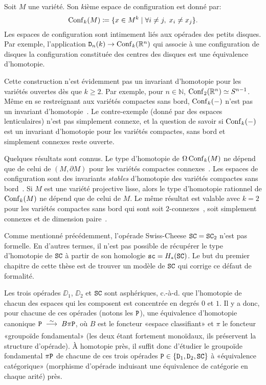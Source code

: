 Soit $M$ une variété. Son $k$ième espace de configuration est donné par:
\[ \operatorname{Conf}_{k}(M) \coloneqq \{ x \in M^{k} \mid \forall i \neq j, \; x_{i} \neq x_{j} \}. \]
Les espaces de configuration sont intimement liés aux opérades des petits disques.
Par exemple, l'application $\mathtt{D}_{n}(k) \to \operatorname{Conf}_{k}(\mathbb{R}^{n})$ qui associe à une configuration de disques la configuration constituée des centres des disques est une équivalence d'homotopie.

Cette construction n'est évidemment pas un invariant d'homotopie pour les variétés ouvertes dès que $k \geq 2$.
Par exemple, pour $n \in \mathbb{N}$, $\operatorname{Conf}_{2}(\mathbb{R}^{n}) \simeq S^{n-1}$.
Même en se restreignant aux variétés compactes sans bord, $\operatorname{Conf}_{k}(-)$ n'est pas un invariant d'homotopie~\cite{LongoniSalvatore2005}.
Le contre-exemple (donné par des espaces lenticulaires) n'est pas simplement connexe, et la question de savoir si $\operatorname{Conf}_{k}(-)$ est un invariant d'homotopie pour les variétés compactes, sans bord et simplement connexes reste ouverte.

Quelques résultats sont connus.
Le type d'homotopie de $\Omega \operatorname{Conf}_{k}(M)$ ne dépend que de celui de $(M, \partial M)$ pour les variétés compactes connexes~\cite{Levitt1995}.
Les espaces de configuration sont des invariants \emph{stables} d'homotopie des variétés compactes sans bord~\cite{AouinaKlein2004}.
Si $M$ est une variété projective lisse, alors le type d'homotopie rationnel de $\operatorname{Conf}_{k}(M)$ ne dépend que de celui de $M$.
Le même résultat est valable avec $k = 2$ pour les variétés compactes sans bord qui sont soit $2$-connexes~\cite{LambrechtsStanley2004}, soit simplement connexes et de dimension paire~\cite{CordovaBulens2015}.


Comme mentionné précédemment, l'opérade Swiss-Cheese $\mathtt{SC} = \mathtt{SC}_{2}$ n'est pas formelle.
En d'autres termes, il n'est pas possible de récupérer le type d'homotopie de $\mathtt{SC}$ à partir de son homologie $\mathtt{sc} = H_{*}(\mathtt{SC})$.
Le but du premier chapitre de cette thèse est de trouver un modèle de $\mathtt{SC}$ qui corrige ce défaut de formalité.

Les trois opérades $\DD_{1}$, $\DD_{2}$ et $\mathtt{SC}$ sont asphériques, c.-à-d. que l'homotopie de chacun des espaces qui les composent est concentrée en degrés $0$ et $1$.
Il y a donc, pour chacune de ces opérades (notons les $\mathtt{P}$), une équivalence d'homotopie canonique $\PP \qiso B \pi \PP$, où $B$ est le foncteur «espace classifiant» et $\pi$ le foncteur «groupoïde fondamental» (les deux étant fortement monoïdaux, ils préservent la structure d'opérade).
À homotopie près, il suffit donc d'étudier le groupoïde fondamental $\pi \mathtt{P}$ de chacune de ces trois opérades $\mathtt{P} \in \{ \mathtt{D}_{1}, \mathtt{D}_{2}, \mathtt{SC} \}$ à «équivalence catégorique» (morphisme d'opérade induisant une équivalence de catégorie en chaque arité) près.

